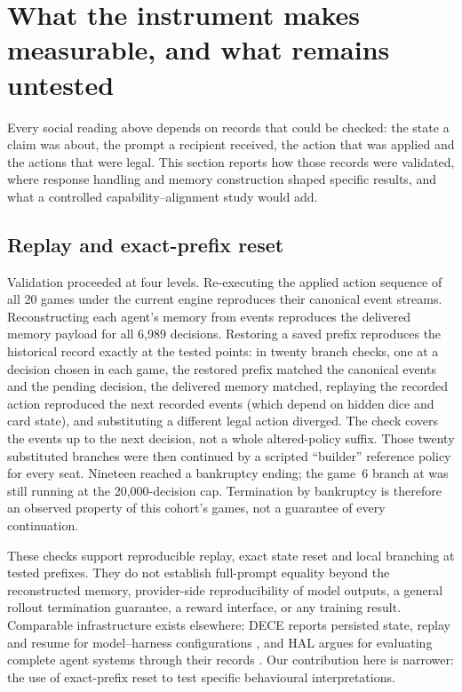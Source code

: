 \section{What the instrument makes measurable, and what remains untested}\label{sec:instrument}

Every social reading above depends on records that could be checked: the state a claim was about, the prompt a recipient received, the action that was applied and the actions that were legal. This section reports how those records were validated, where response handling and memory construction shaped specific results, and what a controlled capability--alignment study would add.

\subsection{Replay and exact-prefix reset}\label{sec:instrument-replay}

Validation proceeded at four levels. Re-executing the applied action sequence of all 20 games under the current engine reproduces their canonical event streams. Reconstructing each agent's memory from events reproduces the delivered memory payload for all 6,989 decisions. Restoring a saved prefix reproduces the historical record exactly at the tested points: in twenty branch checks, one at a decision chosen in each game, the restored prefix matched the canonical events and the pending decision, the delivered memory matched, replaying the recorded action reproduced the next recorded events (which depend on hidden dice and card state), and substituting a different legal action diverged. The check covers the events up to the next decision, not a whole altered-policy suffix. Those twenty substituted branches were then continued by a scripted ``builder'' reference policy for every seat. Nineteen reached a bankruptcy ending; the game~6 branch at  was still running at the 20,000-decision cap. Termination by bankruptcy is therefore an observed property of this cohort's games, not a guarantee of every continuation.

These checks support reproducible replay, exact state reset and local branching at tested prefixes. They do not establish full-prompt equality beyond the reconstructed memory, provider-side reproducibility of model outputs, a general rollout termination guarantee, a reward interface, or any training result. Comparable infrastructure exists elsewhere: DECE reports persisted state, replay and resume for model--harness configurations \citep{zhang2026dece}, and HAL argues for evaluating complete agent systems through their records \citep{kapoor2026hal}. Our contribution here is narrower: the use of exact-prefix reset to test specific behavioural interpretations.

